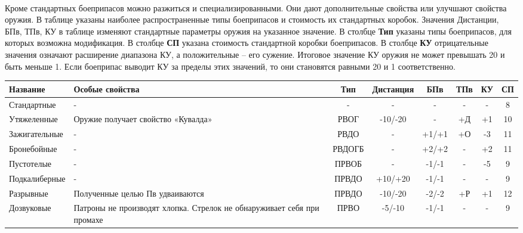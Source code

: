 \paragraph{} Кроме стандартных боеприпасов можно разжиться и специализированными. Они дают дополнительные свойства или улучшают свойства оружия. В таблице указаны наиболее распространенные типы боеприпасов и стоимость их стандартных коробок. Значения Дистанции, БПв, ТПв, КУ в таблице изменяют стандартные параметры оружия на указанное значение. 
\newline В столбце \textbf{Тип} указаны типы боеприпасов, для которых возможна модификация.
\newline В столбце \textbf{СП} указана стоимость стандартной коробки боеприпасов. 
\newline В столбце \textbf{КУ} отрицательные значения означают расширение диапазона КУ, а положительные – его сужение. Итоговое значение КУ оружия не может превышать 20 и быть меньше 1. Если боеприпас выводит КУ за пределы этих значений, то они становятся равными 20 и 1 соответственно. 

\begin{longtable}{|p{3cm}|p{2.5cm}|c||c|c|c|c||c|}\hline
Название & Особые свойства & Тип & Дистанция & БПв & ТПв & КУ & СП\\ \hline
Стандартные & - & - & - & - & - & - & 8\\ \hline
Утяжеленные & Оружие получает свойство «Кувалда» & РВОГ & -10/-20 & - & +Д & +1 & 10\\ \hline
Зажигательные & - & РВДО & - & +1/+1 & +О & -3 & 11\\ \hline
Бронебойные & - & РВДОГБ & - & +2/+2 & - & +2 & 11\\ \hline
Пустотелые & - & ПРВОБ & - & -1/-1 & - & -5 & 9\\ \hline
Подкалиберные & - & ПРВДО & +10/+20 & -1/-1 & - & - & 9\\ \hline
Разрывные & Полученные целью Пв удваиваются & ПРВДО & -10/-20 & -2/-2 & +Р & +1 & 12\\ \hline
Дозвуковые & Патроны не производят хлопка. Стрелок не обнаруживает себя при промахе & ПРВО & -5/-10 & -1/-1 & - & - & 9\\ \hline
\end{longtable}
